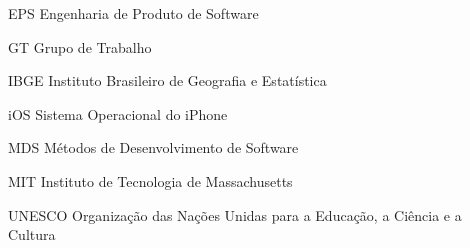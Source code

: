\begin{siglas}
  \item[EPS] Engenharia de Produto de Software
  \item[GT] Grupo de Trabalho
  \item[IBGE] Instituto Brasileiro de Geografia e Estatística
  \item[iOS] Sistema Operacional do iPhone 
  \item[MDS] Métodos de Desenvolvimento de Software
  \item[MIT] Instituto de Tecnologia de Massachusetts
  \item[UNESCO] Organização das Nações Unidas para a Educação, a Ciência e a Cultura
\end{siglas}
